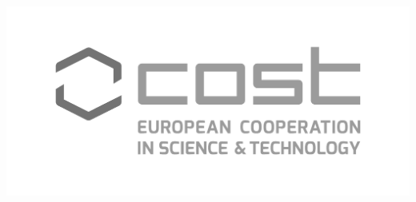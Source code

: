 \documentclass{article}
\begin{document}
\begin{minipage}[t]{0.29\textwidth}
	\vspace{\parskip}\vspace{\parskip}\vspace{\parskip}\vspace{\parskip}
		
	\includegraphics[height=0.2\textwidth]{cost.pdf}\hspace{1.5em}
	
	\end{minipage}%
\end{document}
